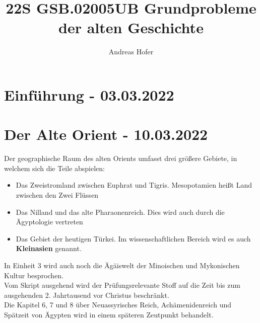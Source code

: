 \documentclass{article}
\title{22S GSB.02005UB Grundprobleme der alten Geschichte}
\author{Andreas Hofer}
\begin{document}
	\section{Einführung - 03.03.2022}
	\section{Der Alte Orient - 10.03.2022}
	Der geographische Raum des alten Orients umfasst drei größere Gebiete, in welchem sich die Teile abspielen:
	\begin{itemize}
		\item{Das Zweistromland zwischen Euphrat und Tigris. Mesopotamien heißt Land zwischen den Zwei Flüssen}
		\item{Das Nilland und das alte Pharaonenreich. Dies wird auch durch die Ägyptologie vertreten}
		\item{Das Gebiet der heutigen Türkei. Im wissenschaftlichen Bereich wird es auch \textbf{Kleinasien} genannt.}	
	\end{itemize}
	In Einheit 3 wird auch noch die Ägäiswelt der Minoischen und Mykonischen Kultur besprochen. \\
	Vom Skript ausgehend wird der Prüfungsrelevante Stoff auf die Zeit bis zum ausgehenden 2. Jahrtausend vor Christus beschränkt. \\
	Die Kapitel 6, 7 und 8 über Neuassyrisches Reich, Achämenidenreich und Spätzeit von Ägypten wird in einem späteren Zeutpunkt behandelt. \\
\end{document}
